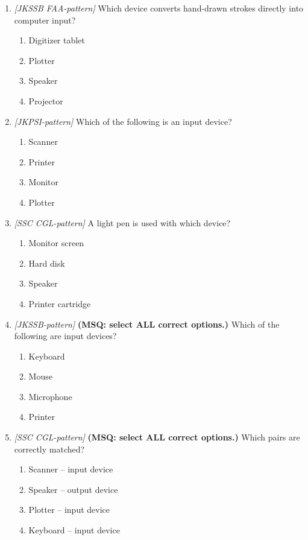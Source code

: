 \documentclass[11pt]{article}
\begin{document}
\begin{enumerate}[label=\textbf{Q\arabic*.}, leftmargin=*]
\item \textit{[JKSSB FAA-pattern]} Which device converts hand-drawn strokes directly into computer input?
  \begin{enumerate}[label=\Alph*.]
    \item Digitizer tablet
    \item Plotter
    \item Speaker
    \item Projector
  \end{enumerate}
\item \textit{[JKPSI-pattern]} Which of the following is an input device?
  \begin{enumerate}[label=\Alph*.]
    \item Scanner
    \item Printer
    \item Monitor
    \item Plotter
  \end{enumerate}
\item \textit{[SSC CGL-pattern]} A light pen is used with which device?
  \begin{enumerate}[label=\Alph*.]
    \item Monitor screen
    \item Hard disk
    \item Speaker
    \item Printer cartridge
  \end{enumerate}
\item \textit{[JKSSB-pattern]} \textbf{(MSQ: select ALL correct options.)} Which of the following are input devices?
  \begin{enumerate}[label=\Alph*.]
    \item Keyboard
    \item Mouse
    \item Microphone
    \item Printer
  \end{enumerate}
\item \textit{[SSC CGL-pattern]} \textbf{(MSQ: select ALL correct options.)} Which pairs are correctly matched?
  \begin{enumerate}[label=\Alph*.]
    \item Scanner -- input device
    \item Speaker -- output device
    \item Plotter -- input device
    \item Keyboard -- input device
  \end{enumerate}
\end{enumerate}
\def\JKSSBLessonID{12}\def\JKSSBAnswers{0}
\end{document}
